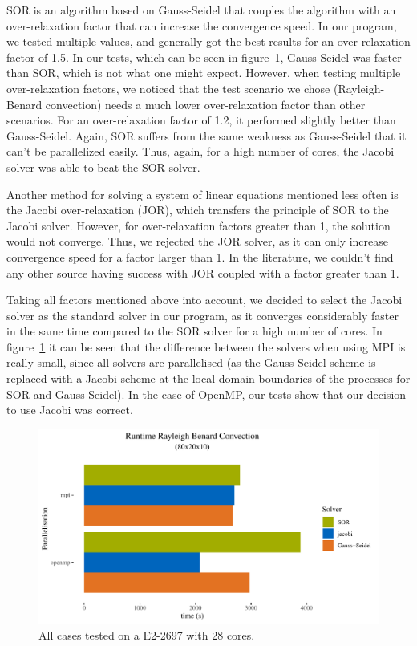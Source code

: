 \documentclass{article}%
\begin{document}
SOR is an algorithm based on Gauss-Seidel that couples the algorithm with an over-relaxation factor that can increase the convergence speed. In our program, we tested multiple values, and generally got the best results for an over-relaxation factor of 1.5. In our tests, which can be seen in figure~\ref{fig:solver}, Gauss-Seidel was faster than SOR, which is not what one might expect. However, when testing multiple over-relaxation factors, we noticed that the test scenario we chose (Rayleigh-Benard convection) needs a much lower over-relaxation factor than other scenarios. For an over-relaxation factor of 1.2, it performed slightly better than Gauss-Seidel. Again, SOR suffers from the same weakness as Gauss-Seidel that it can’t be parallelized easily. Thus, again, for a high number of cores, the Jacobi solver was able to beat the SOR solver.

Another method for solving a system of linear equations mentioned less often is the Jacobi over-relaxation (JOR), which transfers the principle of SOR to the Jacobi solver. However, for over-relaxation factors greater than 1, the solution would not converge. Thus, we rejected the JOR solver, as it can only increase convergence speed for a factor larger than 1. In the literature, we couldn’t find any other source having success with JOR coupled with a factor greater than 1.

Taking all factors mentioned above into account, we decided to select the Jacobi solver as the standard solver in our program, as it converges considerably faster in the same time compared to the SOR solver for a high number of cores. In figure~\ref{fig:solver} it can be seen that the difference between the solvers when using MPI is really small, since all solvers are parallelised (as the Gauss-Seidel scheme is replaced with a Jacobi scheme at the local domain boundaries of the processes for SOR and Gauss-Seidel). In the case of OpenMP, our tests show that our decision to use Jacobi was correct.

\begin{figure}[htb]
\centering
\includegraphics[width=1\linewidth]{../tests/graphs/runtime_rayleigh_benard_convection_8-2-1_solver.pdf}
\caption{All cases tested on a E2-2697 with 28 cores.}
\label{fig:solver}
\end{figure}
\end{document}
